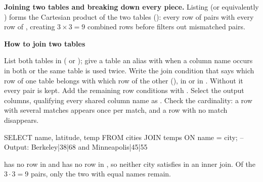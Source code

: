 \documentclass[10pt]{scrartcl}
\newenvironment{howto}[1]{\begin{mdframed}[style=howtostyle]{\color{NavyBlue}\textbf{#1}}\par\vspace{2pt}}{\end{mdframed}}
\begin{document}
\medskip\noindent\textbf{Joining two tables and breaking down every piece.} Listing  (or equivalently ) forms the Cartesian product of the two tables (): every row of  pairs with every row of , creating $3 \times 3 = 9$ combined rows before  filters out mismatched pairs.
\begin{howto}{How to join two tables}
\begin{steps}
  \ii List both tables in  ( or ); give a table an alias with  when a column name occurs in both or the same table is used twice.
  \ii Write the join condition that says which row of one table belongs with which row of the other (), in  or in . Without it every pair is kept.
  \ii Add the remaining row conditions with .
  \ii Select the output columns, qualifying every shared column name as .
  \ii Check the cardinality: a row with several matches appears once per match, and a row with no match disappears.
\end{steps}
\end{howto}
\begin{example*}
\begin{sql}
SELECT name, latitude, temp
FROM   cities JOIN temps ON name = city;
-- Output: Berkeley|38|68  and  Minneapolis|45|55
\end{sql}
 has no row in  and  has no row in , so neither city satisfies  in an inner join. Of the $3\cdot3=9$ pairs, only the two with equal names remain.
\end{example*}
\end{document}
